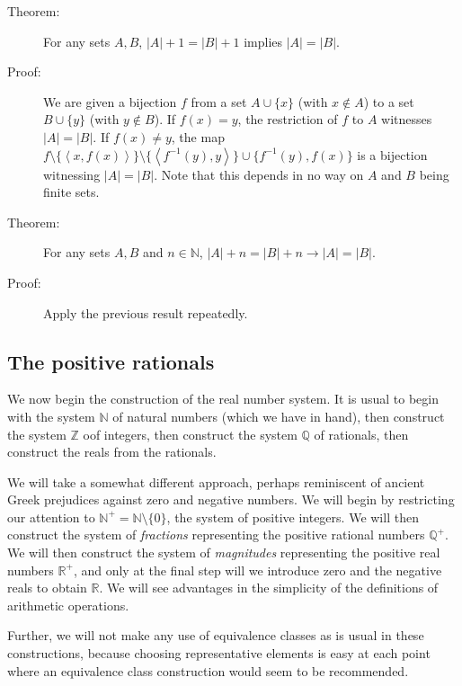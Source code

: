 \documentclass[12pt]{book}
\begin{document}
\begin{description}

\item[Theorem:]  For any sets $A,B$, $|A|+1 = |B|+1$ implies $|A|=|B|$.

\item[Proof:]  We are given a bijection $f$ from a set $A \cup \{x\}$ (with $x \not\in A$) to a set $B \cup \{y\}$ (with $y \not\in B$).  If $f(x)=y$, the restriction of $f$ to
$A$ witnesses $|A|=|B|$.  If $f(x) \neq y$, the map $f \setminus \{\left<x,f(x)\right>\} \setminus \{\left<f^{-1}(y),y\right>\} \cup \{f^{-1}(y),f(x)\}$ is a bijection witnessing $|A|=|B|$.  Note that this depends in no way on $A$ and $B$ being finite sets.

\item[Theorem:]  For any sets $A,B$ and $n \in \mathbb N$, $|A|+n = |B|+n \rightarrow |A|=|B|$.

\item[Proof:]  Apply the previous result repeatedly.


\end{description}

\newpage

\subsection{The positive rationals}

We now begin the construction of the real number system.  It is usual to begin with the system $\mathbb N$ of natural numbers (which we have in hand), then construct the system
$\mathbb Z$ oof integers, then construct the system $\mathbb Q$ of rationals, then construct the reals from the rationals.

We will take a somewhat different approach, perhaps reminiscent of ancient Greek prejudices against zero and negative numbers.  We will begin by restricting our attention to
${\mathbb N}^+ = {\mathbb N} \setminus \{0\}$, the system of positive integers.  We will then construct the system of {\em fractions\/} representing the positive rational numbers
${\mathbb Q}^+$.  We will then construct the system of {\em magnitudes\/} representing the positive real numbers ${\mathbb R}^+$, and only at the final step will we introduce zero and the negative reals to obtain $\mathbb R$.  We will see advantages in the simplicity of the definitions of arithmetic operations.  

Further, we will not make any use of equivalence classes as is usual in these constructions, because choosing representative elements is easy at each point where an equivalence class construction would seem to be recommended.
\end{document}
